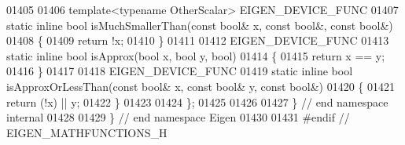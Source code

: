 \begin{DoxyCode}
01405   
01406   \textcolor{keyword}{template}<\textcolor{keyword}{typename} OtherScalar> EIGEN\_DEVICE\_FUNC
01407   \textcolor{keyword}{static} \textcolor{keyword}{inline} \textcolor{keywordtype}{bool} isMuchSmallerThan(\textcolor{keyword}{const} \textcolor{keywordtype}{bool}& x, \textcolor{keyword}{const} \textcolor{keywordtype}{bool}&, \textcolor{keyword}{const} \textcolor{keywordtype}{bool}&)
01408   \{
01409     \textcolor{keywordflow}{return} !x;
01410   \}
01411   
01412   EIGEN\_DEVICE\_FUNC
01413   \textcolor{keyword}{static} \textcolor{keyword}{inline} \textcolor{keywordtype}{bool} isApprox(\textcolor{keywordtype}{bool} x, \textcolor{keywordtype}{bool} y, \textcolor{keywordtype}{bool})
01414   \{
01415     \textcolor{keywordflow}{return} x == y;
01416   \}
01417 
01418   EIGEN\_DEVICE\_FUNC
01419   \textcolor{keyword}{static} \textcolor{keyword}{inline} \textcolor{keywordtype}{bool} isApproxOrLessThan(\textcolor{keyword}{const} \textcolor{keywordtype}{bool}& x, \textcolor{keyword}{const} \textcolor{keywordtype}{bool}& y, \textcolor{keyword}{const} \textcolor{keywordtype}{bool}&)
01420   \{
01421     \textcolor{keywordflow}{return} (!x) || y;
01422   \}
01423   
01424 \};
01425 
01426   
01427 \} \textcolor{comment}{// end namespace internal}
01428 
01429 \} \textcolor{comment}{// end namespace Eigen}
01430 
01431 \textcolor{preprocessor}{#endif // EIGEN\_MATHFUNCTIONS\_H}
\end{DoxyCode}
